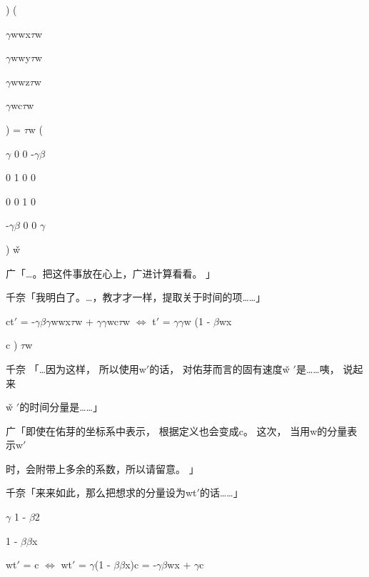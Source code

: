 ) (\par
$\gamma$wwx$\tau$w\par
$\gamma$wwy$\tau$w\par
$\gamma$wwz$\tau$w\par
$\gamma$wc$\tau$w\par
) = $\tau$w (\par
$\gamma$ 0 0 -$\gamma$$\beta$\par
0 1 0 0\par
0 0 1 0\par
-$\gamma$$\beta$ 0 0 $\gamma$\par
) w̌\par
广「…。把这件事放在心上，广进计算看看。 」\par
千奈「我明白了。…，教才才一样，提取关于时间的项……」\par
ct$\prime$ = -$\gamma$$\beta$$\gamma$wwx$\tau$w + $\gamma$$\gamma$wc$\tau$w $\Leftrightarrow$ t$\prime$ = $\gamma$$\gamma$w (1 - $\beta$wx\par
c ) $\tau$w\par
千奈 「…因为这样， 所以使用w$\prime$的话， 对佑芽而言的固有速度w̌ $\prime$是……咦， 说起来\par
w̌ $\prime$的时间分量是……」\par
广「即使在佑芽的坐标系中表示， 根据定义也会变成c。 这次， 当用w的分量表示w$\prime$\par
时，会附带上多余的系数，所以请留意。 」\par
千奈「来来如此，那么把想求的分量设为wt$\prime$的话……」\par
$\gamma$ 1 - $\beta$2\par
1 - $\beta$$\beta$x\par
wt$\prime$ = c $\Leftrightarrow$ wt$\prime$ = $\gamma$(1 - $\beta$$\beta$x)c = -$\gamma$$\beta$wx + $\gamma$c\par

